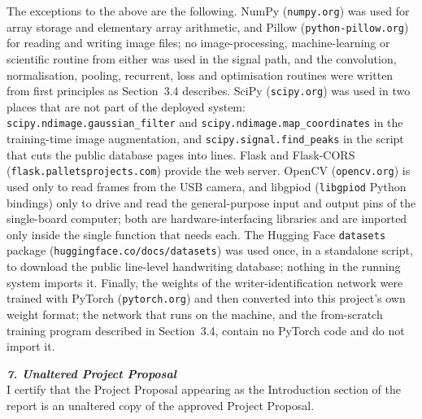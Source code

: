 The exceptions to the above are the following. NumPy (\texttt{numpy.org}) was used for array
storage and elementary array arithmetic, and Pillow (\texttt{python-pillow.org}) for reading and
writing image files; no image-processing, machine-learning or scientific routine from either was
used in the signal path, and the convolution, normalisation, pooling, recurrent, loss and
optimisation routines were written from first principles as Section~3.4 describes. SciPy
(\texttt{scipy.org}) was used in two places that are not part of the deployed system:
\texttt{scipy.ndimage.gaussian\_filter} and \texttt{scipy.ndimage.map\_coordinates} in the
training-time image augmentation, and \texttt{scipy.signal.find\_peaks} in the script that cuts the
public database pages into lines. Flask and Flask-CORS (\texttt{flask.palletsprojects.com}) provide
the web server. OpenCV (\texttt{opencv.org}) is used only to read frames from the USB camera, and
libgpiod (\texttt{libgpiod} Python bindings) only to drive and read the general-purpose input and
output pins of the single-board computer; both are hardware-interfacing libraries and are imported
only inside the single function that needs each. The Hugging Face \texttt{datasets} package
(\texttt{huggingface.co/docs/datasets}) was used once, in a standalone script, to download the
public line-level handwriting database; nothing in the running system imports it. Finally, the
weights of the writer-identification network were trained with PyTorch (\texttt{pytorch.org}) and
then converted into this project's own weight format; the network that runs on the machine, and the
from-scratch training program described in Section~3.4, contain no PyTorch code and do not import
it.


\textbf{\textit{7. Unaltered Project Proposal}}
\\[2ex]
I certify that the Project Proposal appearing as the Introduction section of the report is an unaltered copy of the approved Project Proposal.

